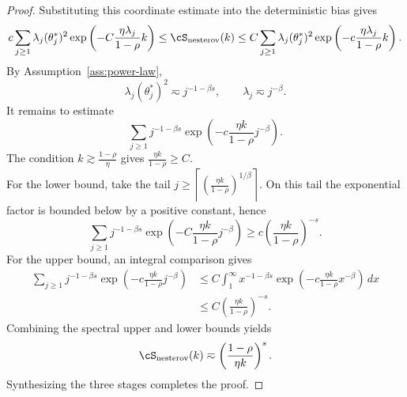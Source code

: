 \documentclass[11pt]{article}
\newcommand{\nesterov}{\mathrm{nesterov}}
\begin{document}
\begin{proof}
Substituting this coordinate estimate into the deterministic bias gives
\[
    c\sum_{j\ge1}\lambda_j(\theta_j^*)^2
    \exp\left(-C\frac{\eta\lambda_j}{1-\rho}k\right)
    \le
    \cS_{\nesterov}(k)
    \le
    C\sum_{j\ge1}\lambda_j(\theta_j^*)^2
    \exp\left(-c\frac{\eta\lambda_j}{1-\rho}k\right).
\]
By Assumption~\ref{ass:power-law},
\[
    \lambda_j(\theta_j^*)^2\eqsim j^{-1-\beta s},
    \qquad
    \lambda_j\eqsim j^{-\beta}.
\]
It remains to estimate
\[
    \sum_{j\ge1}j^{-1-\beta s}
    \exp\left(-c\frac{\eta k}{1-\rho}j^{-\beta}\right).
\]
The condition $k \gtrsim \frac{1-\rho}{\eta}$ gives \(\frac{\eta k}{1-\rho}\ge C\). \\
For the lower bound, take the tail
$j\ge
    \left\lceil
    \left(\frac{\eta k}{1-\rho}\right)^{1/\beta}
    \right\rceil.$
On this tail the exponential factor is bounded below by a positive constant, hence
\[
    \sum_{j\ge1}j^{-1-\beta s}
    \exp\left(-C\frac{\eta k}{1-\rho}j^{-\beta}\right)
    \ge
    c\left(\frac{\eta k}{1-\rho}\right)^{-s}.
\]
For the upper bound, an integral comparison gives
\[
\begin{aligned}
    \sum_{j\ge1}j^{-1-\beta s}
    \exp\left(-c\frac{\eta k}{1-\rho}j^{-\beta}\right)
    &\le
    C\int_1^\infty x^{-1-\beta s}
    \exp\left(-c\frac{\eta k}{1-\rho}x^{-\beta}\right)\,dx \\
    &\le
    C\left(\frac{\eta k}{1-\rho}\right)^{-s}.
\end{aligned}
\]
Combining the spectral upper and lower bounds yields
\[
    \cS_{\nesterov}(k)
    \eqsim
    \left(\frac{1-\rho}{\eta k}\right)^s.
\]
Synthesizing the three stages completes the proof.
\end{proof}
\end{document}
